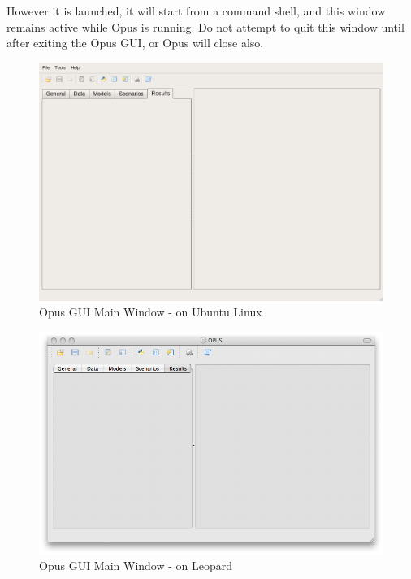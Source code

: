 However it is launched, it will start from a command shell, and this
window remains active while Opus is running.  Do not attempt to quit
this window until after exiting the Opus GUI, or Opus will close also.  

\begin{figure}[htp]
\begin{center}
\includegraphics[scale=0.42]{part-gui/images/opus-startup.png}
\end{center}
\caption{Opus GUI Main Window - on Ubuntu Linux}
\label{fig:opus1-linux}
\end{figure}

\begin{figure}[htp]
\begin{center}
\includegraphics[scale=0.52]{part-gui/images/opus-startup-mac.png}
\end{center}
\caption{Opus GUI Main Window - on Leopard}
\label{fig:opus1-mac}
\end{figure}

